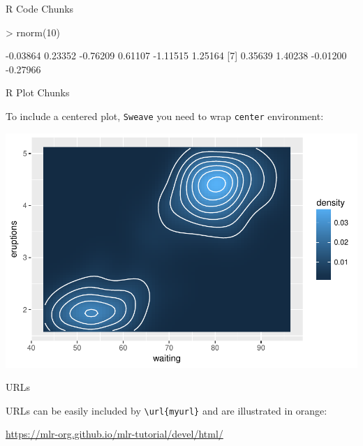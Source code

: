\begin{frame}[fragile]{R Code Chunks}

\begin{Schunk}
\begin{Sinput}
> rnorm(10)
\end{Sinput}
\begin{Soutput}
 [1] -0.03864  0.23352 -0.76209  0.61107 -1.11515  1.25164
 [7]  0.35639  1.40238 -0.01200 -0.27966
\end{Soutput}
\end{Schunk}

\end{frame}

\begin{frame}[fragile]{R Plot Chunks}

To include a \alert{centered plot}, \texttt{Sweave} you need to wrap
\texttt{center} environment:

\begin{center}
\includegraphics{demo_slides-003}
\end{center}

\end{frame}

\begin{frame}{URLs}

URLs can be easily included by \texttt{\textbackslash url\{myurl\}} and are illustrated in
orange:
\begin{center}
  \url{https://mlr-org.github.io/mlr-tutorial/devel/html/}
\end{center}
\end{frame}

